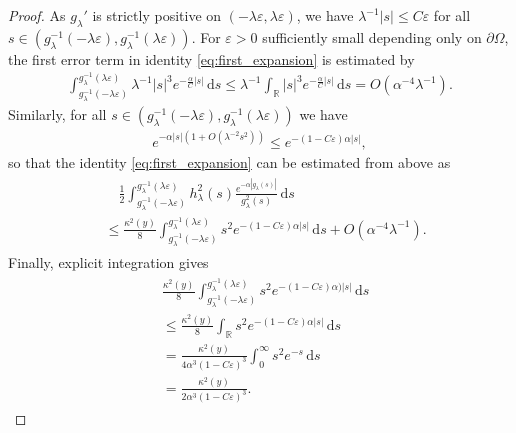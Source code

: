 \documentclass[11pt]{article}
\numberwithin{statement}{section}
\numberwithin{equation}{section}
\theoremstyle{remark}
\newcommand{\R}{\mathbb R} 				%
\newcommand{\intd}{\, \mathrm{d}} 				%
\newcommand{\eps}{\varepsilon}
\begin{document}
\begin{proof}
	 As $g_\lambda'$ is strictly positive on
         $(-\lambda \eps, \lambda \eps)$, we have
         $\lambda^{-1} |s| \leq C \eps$ for all
         $s \in \left(g_\lambda^{-1}(-\lambda \eps) ,
           g_\lambda^{-1}(\lambda \eps) \right)$.  For $\eps>0$
         sufficiently small depending only on $\partial \Omega$, the
         first error term in identity \eqref{eq:first_expansion} is
         estimated by
	 \begin{align}
           \int_{g_\lambda^{-1}(-\lambda \eps)
           }^{g_\lambda^{-1}(\lambda \eps)} \lambda^{-1} |s|^3
           e^{-\frac{\alpha}{C}|s|} \intd s \leq \lambda^{-1}
           \int_{\R} |s|^3e^{-\frac{\alpha}{C}|s|} \intd s =
           O(\alpha^{-4}\lambda^{-1}). 
	 \end{align}
	 Similarly, for all
         $s \in \left(g_\lambda^{-1}(-\lambda \eps) ,
           g_\lambda^{-1}(\lambda \eps) \right)$ we have 
	 \begin{align}
           e^{-\alpha |s|\left(1 + O(\lambda^{-2} s^2)\right)} \leq e^{-(1-C\eps)\alpha |s|},
	 \end{align}
	 so that the identity \eqref{eq:first_expansion} can be
         estimated from above as
	\begin{align}\label{eq:terror_term_3}
	  \begin{split}
            & \quad \frac{1 }{2}\int_{g_\lambda^{-1}(-\lambda \eps)
            }^{g_\lambda^{-1}(\lambda \eps)} h^2_\lambda(s)
            \frac{e^{-\alpha |g_\lambda(s)|}}{g^2_\lambda(s) } \intd
            s\\
            & \leq \frac{ \kappa^2(y) }{8}
            \int_{g_\lambda^{-1}(-\lambda \eps)
            }^{g_\lambda^{-1}(\lambda \eps)} s^2 e^{-(1-C\eps)\alpha
              |s|} \intd s + O(\alpha^{-4}\lambda^{-1}).
	  \end{split}
	\end{align}
	Finally, explicit integration gives
	\begin{align}\label{eq:terror_term_4}
	  \begin{split}
            &\frac{ \kappa^2(y) }{8} \int_{g_\lambda^{-1}(-\lambda
              \eps) }^{g_\lambda^{-1}(\lambda \eps)} s^2
            e^{-(1-C\eps)\alpha )|s|} \intd s\\ 
            & \leq \frac{\kappa^2(y)}{8} \int_{\R} s^2
            e^{-(1-C\eps)\alpha |s|} \intd s\\ 
            & = \frac{ \kappa^2(y)}{4\alpha^3(1-C\eps)^3}
            \int_0^\infty s^2 e^{-s} \intd s  \\ 
            & = \frac{ \kappa^2(y)}{2\alpha^3(1-C\eps)^3}.
	  \end{split}
	\end{align}
	

\end{proof}
\end{document}
